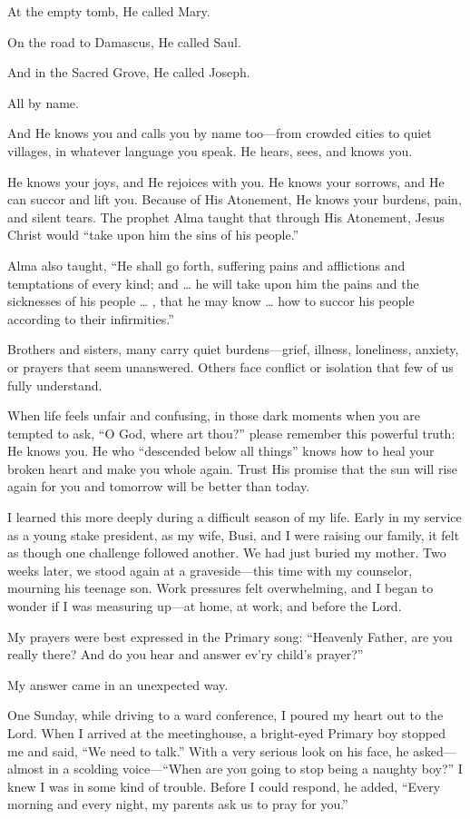 \documentclass[letterpaper, 11pt]{report}
\newcommand{\intalkheader}[1]{
    \vspace{0.75em}
    \noindent{\normalsize\bfseries #1}
    \par\nopagebreak %
    \vspace{0.25em}
    \nopagebreak     %
}
\begin{document}
At the empty tomb, He called Mary.

On the road to Damascus, He called Saul.

And in the Sacred Grove, He called Joseph.

All by name.

And He knows you and calls you by name too—from crowded cities to quiet villages, in whatever language you speak. He hears, sees, and knows you.

He knows your joys, and He rejoices with you. He knows your sorrows, and He can succor and lift you. Because of His Atonement, He knows your burdens, pain, and silent tears. The prophet Alma taught that through His Atonement, Jesus Christ would “take upon him the sins of his people.”

Alma also taught, “He shall go forth, suffering pains and afflictions and temptations of every kind; and … he will take upon him the pains and the sicknesses of his people … , that he may know … how to succor his people according to their infirmities.”

\intalkheader{Others Will Be Placed in Your Way}

Brothers and sisters, many carry quiet burdens—grief, illness, loneliness, anxiety, or prayers that seem unanswered. Others face conflict or isolation that few of us fully understand.

When life feels unfair and confusing, in those dark moments when you are tempted to ask, “O God, where art thou?” please remember this powerful truth: He knows you. He who “descended below all things” knows how to heal your broken heart and make you whole again. Trust His promise that the sun will rise again for you and tomorrow will be better than today.

I learned this more deeply during a difficult season of my life. Early in my service as a young stake president, as my wife, Busi, and I were raising our family, it felt as though one challenge followed another. We had just buried my mother. Two weeks later, we stood again at a graveside—this time with my counselor, mourning his teenage son. Work pressures felt overwhelming, and I began to wonder if I was measuring up—at home, at work, and before the Lord.

My prayers were best expressed in the Primary song: “Heavenly Father, are you really there? And do you hear and answer ev’ry child’s prayer?”

My answer came in an unexpected way.

One Sunday, while driving to a ward conference, I poured my heart out to the Lord. When I arrived at the meetinghouse, a bright-eyed Primary boy stopped me and said, “We need to talk.” With a very serious look on his face, he asked—almost in a scolding voice—“When are you going to stop being a naughty boy?” I knew I was in some kind of trouble. Before I could respond, he added, “Every morning and every night, my parents ask us to pray for you.”
\end{document}
